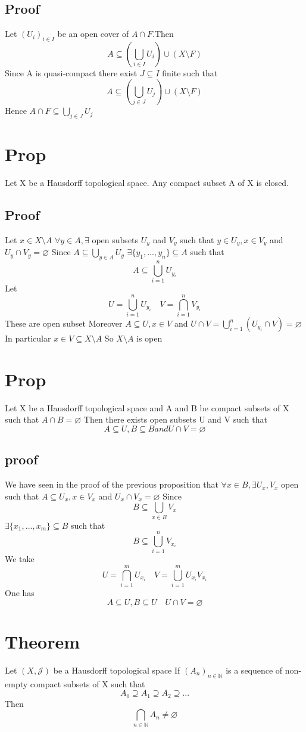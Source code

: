 \documentclass{book}
\begin{document}
\subsection*{Proof}
Let $(U_i)_{i\in I}$ be an open cover of $A\cap F$.Then 
$$A\subseteq(\bigcup\limits_{i\in I}U_i)\cup(X\setminus F)$$
Since A is quasi-compact there exist $J\subseteq I$ finite such that $$A\subseteq(\bigcup\limits_{j\in J}U_j)\cup(X\setminus F)$$
Hence $A\cap F\subseteq \bigcup\limits_{j\in J}U_j$
\section{Prop}
Let X be a Hausdorff topological space. Any compact subset A of X is closed.
\subsection*{Proof}Let $x\in X\setminus A$ $\forall y\in A,\exists$ open subsets $U_y$ nad $V_y$ such that $y\in U_y,x\in V_y$ and $U_y\cap V_y=\varnothing$ Since $A\subseteq\bigcup\limits_{y\in A}U_y$
$\exists\{y_1,...,y_n\}\subseteq A$ such that $$A\subseteq\bigcup\limits_{i=1}^nU_{y_i}$$
Let $$U=\bigcup\limits_{i=1}^nU_{y_i}\quad V=\bigcap\limits_{i=1}^nV_{y_i}$$ These are open subset Moreover $A\subseteq U,x\in V $ and $U\cap V=\bigcup\limits_{i=1}^n(U_{y_i}\cap V)=\varnothing$
In particular $x\in V\subseteq X\setminus A$
So $X\setminus A$ is open
\section{Prop}
Let X be a Hausdorff topological space and A and B be compact subsets of X such that $A\cap B=\varnothing$ Then there exists open subsets U and V such that $$A\subseteq U,B\subseteq B and U\cap V=\varnothing$$
\subsection*{proof}
We have seen in the proof of the previous proposition that $\forall x\in B,\exists U_x,V_x$ open such that $A\subseteq U_x, x\in V_x$ and $U_x\cap V_x=\varnothing$ Since $$B\subseteq\bigcup\limits_{x\in B}V_x$$
$\exists\{x_1,...,x_m\}\subseteq B$ such that $$B\subseteq \bigcup\limits_{i=1}^nV_{x_i}$$
We take $$U=\bigcap\limits_{i=1}^mU_{x_i}\quad V=\bigcup\limits_{i=1}^mU_{x_i}V_{x_i}$$
One has $$A\subseteq U,B\subseteq U\quad U\cap V=\varnothing$$
\section{Theorem}
Let $(X,\mathcal{J})$ be a Hausdorff topological space If $(A_n)_{n\in \mathbb{N}}$ is a sequence of non-empty compact subsets of X such that $$A_0\supseteq A_1\supseteq A_2\supseteq...$$ Then $$\bigcap\limits_{n\in \mathbb{N}}A_n\not=\varnothing$$
\end{document}
